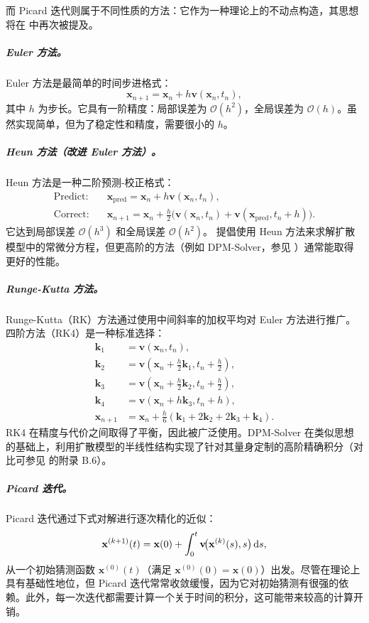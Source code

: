 而 Picard 迭代则属于不同性质的方法：它作为一种理论上的不动点构造，其思想将在
 中再次被提及。


\subparagraph{Euler 方法。}
Euler 方法是最简单的时间步进格式：
\[
\mathbf{x}_{n+1} = \mathbf{x}_n + h \mathbf{v}(\mathbf{x}_n, t_n),
\]
其中 $h$ 为步长。它具有一阶精度：局部误差为 $\mathcal{O}(h^2)$，全局误差为 $\mathcal{O}(h)$。虽然实现简单，但为了稳定性和精度，需要很小的 $h$。

\subparagraph{Heun 方法（改进 Euler 方法）。}
Heun 方法是一种二阶预测-校正格式：
\begin{align*}
\text{Predict:} \quad &\mathbf{x}_{\text{pred}} = \mathbf{x}_n + h \mathbf{v}(\mathbf{x}_n, t_n), \\
\text{Correct:} \quad &\mathbf{x}_{n+1} = \mathbf{x}_n + \frac{h}{2} \big(\mathbf{v}(\mathbf{x}_n, t_n) + \mathbf{v}(\mathbf{x}_{\text{pred}}, t_n + h)\big).
\end{align*}
它达到局部误差 $\mathcal{O}(h^3)$ 和全局误差 $\mathcal{O}(h^2)$。\citet{karras2022elucidating} 提倡使用 Heun 方法来求解扩散模型中的常微分方程，但更高阶的方法（例如 DPM-Solver，参见 ）通常能取得更好的性能。

\subparagraph{Runge-Kutta 方法。}
Runge-Kutta（RK）方法通过使用中间斜率的加权平均对 Euler 方法进行推广。四阶方法（RK4）是一种标准选择：
\begin{align*}
\mathbf{k}_1 &= \mathbf{v}(\mathbf{x}_n, t_n), \\
\mathbf{k}_2 &= \mathbf{v}(\mathbf{x}_n + \tfrac{h}{2} \mathbf{k}_1, t_n + \tfrac{h}{2}), \\
\mathbf{k}_3 &= \mathbf{v}(\mathbf{x}_n + \tfrac{h}{2} \mathbf{k}_2, t_n + \tfrac{h}{2}), \\
\mathbf{k}_4 &= \mathbf{v}(\mathbf{x}_n + h \mathbf{k}_3, t_n + h), \\
\mathbf{x}_{n+1} &= \mathbf{x}_n + \tfrac{h}{6}(\mathbf{k}_1 + 2\mathbf{k}_2 + 2\mathbf{k}_3 + \mathbf{k}_4).
\end{align*}
RK4 在精度与代价之间取得了平衡，因此被广泛使用。DPM-Solver 在类似思想的基础上，利用扩散模型的半线性结构实现了针对其量身定制的高阶精确积分（对比可参见 \citep{lu2022dpm} 的附录 B.6）。

\subparagraph{Picard 迭代。}
Picard 迭代通过下式对解进行逐次精化的近似：
\[
\mathbf{x}^{(k+1)}(t)
= \mathbf{x}(0) + \int_0^t \mathbf{v}\!\big(\mathbf{x}^{(k)}(s), s\big) \mathop{}\!\mathrm{d} s,
\]
从一个初始猜测函数
$\mathbf{x}^{(0)}(t)$（满足 $\mathbf{x}^{(0)}(0)=\mathbf{x}(0)$）出发。尽管在理论上具有基础性地位，但 Picard 迭代常常收敛缓慢，因为它对初始猜测有很强的依赖。此外，每一次迭代都需要计算一个关于时间的积分，这可能带来较高的计算开销。



